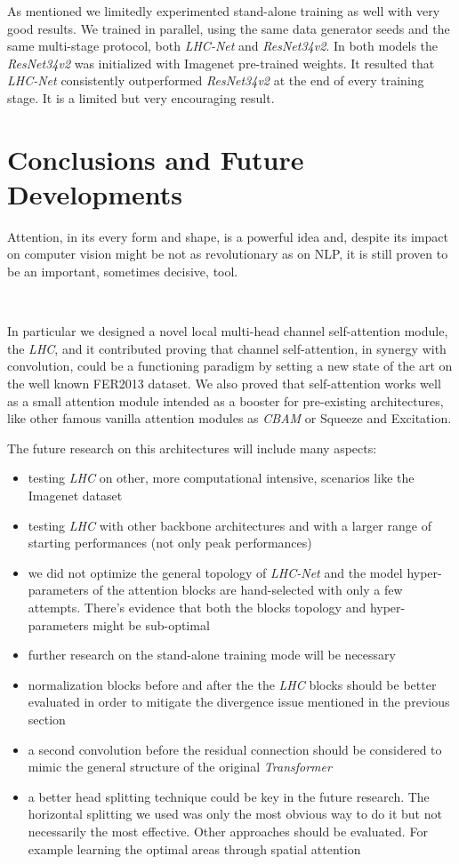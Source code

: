 \documentclass[fleqn,10pt]{SelfArx}
\begin{document}
As mentioned we limitedly experimented stand-alone training as well with very good results. We trained in parallel, using the same data generator seeds and the same multi-stage protocol, both \textit{LHC-Net} and \textit{ResNet34v2}. In both models the \textit{ResNet34v2} was initialized with Imagenet pre-trained weights. It resulted that \textit{LHC-Net} consistently outperformed \textit{ResNet34v2} at the end of every training stage. It is a limited but very encouraging result.

\section{Conclusions and Future Developments}
Attention, in its every form and shape, is a powerful idea and, despite its impact on computer vision might be not as revolutionary as on NLP, it is still proven to be an important, sometimes decisive, tool.

\

In particular we designed a novel local multi-head channel self-attention module, the \textit{LHC},  and it contributed proving that channel self-attention, in synergy with convolution, could be a functioning paradigm by setting a new state of the art on the well known FER2013 dataset. We also proved that self-attention works well as a small attention module intended as a booster for pre-existing architectures, like other famous vanilla attention modules as \textit{CBAM} or Squeeze and Excitation.

The future research on this architectures will include many aspects:

\begin{itemize}
\item testing \textit{LHC} on other, more computational intensive, scenarios like the Imagenet dataset
\item testing \textit{LHC} with other backbone architectures and with a larger range of starting performances (not only peak performances)
\item we did not optimize the general topology of \textit{LHC-Net} and the model hyper-parameters of the attention blocks are hand-selected with only a few attempts. There's evidence that both the  blocks topology and hyper-parameters might be sub-optimal
\item further research on the stand-alone training mode will be necessary
\item normalization blocks before and after the the \textit{LHC} blocks should be better evaluated in order to mitigate the divergence issue mentioned in the previous section
\item a second convolution before the residual connection should be considered to mimic the general structure of the original \textit{Transformer}
\item a better head splitting technique could be key in the future research. The horizontal splitting we used was only the most obvious way to do it but not necessarily the most effective. Other approaches should be evaluated. For example learning the optimal areas through spatial attention
\end{itemize}
\end{document}
